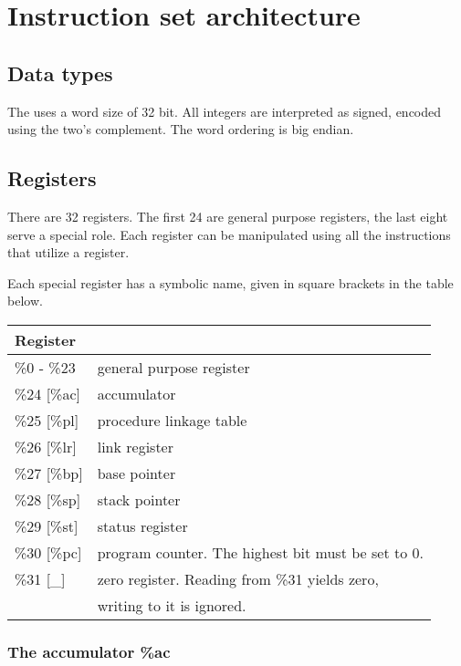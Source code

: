 \section{Instruction set architecture}

\subsection{Data types}

The \cpu uses a word size of 32 bit. All integers are interpreted as
signed, encoded using the two's complement. The word ordering is big
endian.

\subsection{Registers}

There are 32 registers. The first 24 are general purpose registers,
the last eight serve a special role. Each register can be manipulated
using all the instructions that utilize a register.

Each special register has a symbolic name, given in square brackets in
the table below.

\begin{center}
  \begin{tabular}{l|l}
    Register & \\
    \hline
    \%0 - \%23   & general purpose register \\
    \%24 [\%ac]  & accumulator \\
    \%25 [\%pl]  & procedure linkage table \\
    \%26 [\%lr]  & link register \\
    \%27 [\%bp]  & base pointer \\
    \%28 [\%sp]  & stack pointer \\
    \%29 [\%st]  & status register \\
    \%30 [\%pc]  & program counter. The highest bit must be set to 0. \\
    \%31 [\_]    & zero register. Reading from \%31 yields zero, \\
                 & writing to it is ignored. \\
  \end{tabular}
\end{center}

\subsubsection{The accumulator \%ac}

